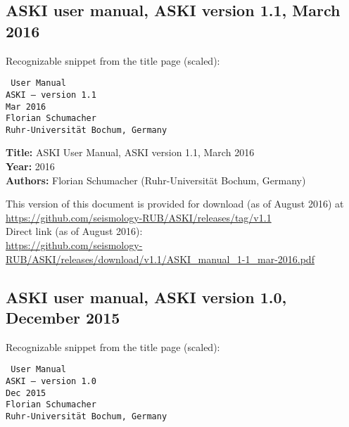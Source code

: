 \subsection*{ASKI user manual, ASKI version 1.1, March 2016}

Recognizable snippet from the title page (scaled):

\begin{minipage}{0.45\textwidth}
  \begin{flushright} \tt
      {\LARGE User Manual} \\[1em]
      {\large ASKI} {\rm --} version 1.1 \\[1em]
      Mar 2016 \\
      Florian Schumacher \\ 
      {\footnotesize Ruhr-Universit\"at Bochum, Germany}
  \end{flushright}
\end{minipage}
\vspace*{1ex}

{\bf Title: } ASKI User Manual, ASKI version 1.1, March 2016\\
{\bf Year: } 2016\\
{\bf Authors: } Florian Schumacher (Ruhr-Universit\"at Bochum, Germany)

This version of this document is provided for download (as of August 2016) at\\
\url{https://github.com/seismology-RUB/ASKI/releases/tag/v1.1}\\
Direct link (as of August 2016):\\
\url{https://github.com/seismology-RUB/ASKI/releases/download/v1.1/ASKI_manual_1-1_mar-2016.pdf}


\subsection*{ASKI user manual, ASKI version 1.0, December 2015}

Recognizable snippet from the title page (scaled):

\begin{minipage}{0.45\textwidth}
  \begin{flushright} \tt
      {\LARGE User Manual} \\[1em]
      {\large ASKI} {\rm --} version 1.0 \\[1em]
      Dec 2015 \\
      Florian Schumacher \\ 
      {\footnotesize Ruhr-Universit\"at Bochum, Germany}
  \end{flushright}
\end{minipage}
\vspace*{1ex}

